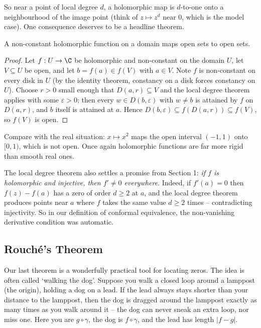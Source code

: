 So near a point of local degree $d$, a holomorphic map is $d$-to-one onto a neighbourhood of the image point (think of $z \mapsto z^d$ near $0$, which is the model case). One consequence deserves to be a headline theorem.

\begin{theorem}
    A non-constant holomorphic function on a domain maps open sets to open sets.
\end{theorem}
\begin{proof}
    Let $f: U \rightarrow \C$ be holomorphic and non-constant on the domain $U$, let $V \subseteq U$ be open, and let $b = f(a) \in f(V)$ with $a \in V$. Note $f$ is non-constant on every disk in $U$ (by the identity theorem, constancy on a disk forces constancy on $U$). Choose $r > 0$ small enough that $D(a, r) \subseteq V$ and the local degree theorem applies with some $\varepsilon > 0$; then every $w \in D(b, \varepsilon)$ with $w \neq b$ is attained by $f$ on $D(a, r)$, and $b$ itself is attained at $a$. Hence $D(b, \varepsilon) \subseteq f(D(a, r)) \subseteq f(V)$, so $f(V)$ is open.
\end{proof}

\begin{remark}
    Compare with the real situation: $x \mapsto x^2$ maps the open interval $(-1, 1)$ onto $[0, 1)$, which is not open. Once again holomorphic functions are far more rigid than smooth real ones.

    The local degree theorem also settles a promise from Section 1: \emph{if $f$ is holomorphic and injective, then $f' \neq 0$ everywhere}. Indeed, if $f'(a) = 0$ then $f(z) - f(a)$ has a zero of order $d \geq 2$ at $a$, and the local degree theorem produces points near $a$ where $f$ takes the same value $d \geq 2$ times -- contradicting injectivity. So in our definition of conformal equivalence, the non-vanishing derivative condition was automatic.
\end{remark}

\subsection{Rouch\'e's Theorem}

Our last theorem is a wonderfully practical tool for locating zeros. The idea is often called `walking the dog'. Suppose you walk a closed loop around a lamppost (the origin), holding a dog on a lead. If the lead always stays shorter than your distance to the lamppost, then the dog is dragged around the lamppost exactly as many times as you walk around it -- the dog can never sneak an extra loop, nor miss one. Here you are $g \circ \gamma$, the dog is $f \circ \gamma$, and the lead has length $|f - g|$.


